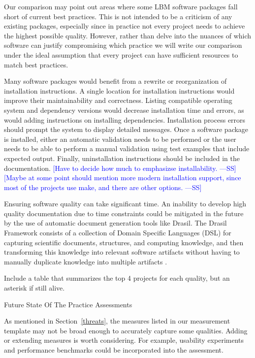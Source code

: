\documentclass[final, 3p, times, authoryear]{elsarticle}
\newcommand{\authornote}[3]{\textcolor{#1}{[#3 ---#2]}}
\newcommand{\authornote}[3]{}
\newcommand{\wss}[1]{\authornote{blue}{SS}{#1}} %
\begin{document}
Our comparison may point out areas where some LBM software packages fall short
of current best practices.  This is not intended to be a criticism of any
existing packages, especially since in practice not every project needs to
achieve the highest possible quality.  However, rather than delve into the
nuances of which software can justify compromising which practice we will write
our comparison under the ideal assumption that every project can have sufficient
resources to match best practices.

Many software packages would benefit from a rewrite or reorganization of
installation instructions. A single location for installation instructions would
improve their maintainability and correctness. Listing compatible operating
system and dependency versions would decrease installation time and errors, as
would adding instructions on installing dependencies. Installation process
errors should prompt the system to display detailed messages. Once a software
package is installed, either an automatic validation needs to be performed or
the user needs to be able to perform a manual validation using test examples
that include expected output. Finally, uninstallation instructions should be
included in the documentation. \wss{Have to decide how much to emphasizse
installability.}  \wss{Maybe at some point should mention more modern
installation support, since most of the projects use make, and there are other
options.}

Ensuring software quality can take significant time. An inability to develop
high quality documentation due to time constraints could be mitigated in the
future by the use of automatic document generation tools like Drasil. The Drasil
Framework consists of a collection of Domain Specific Languages (DSL) for
capturing scientific documents, structures, and computing knowledge, and then
transforming this knowledge into relevant software artifacts without having to
manually duplicate knowledge into multiple artifacts \citep{SzymczakEtAl2016}.

Include a table that summarizes the top 4 projects for each quality, but an
asterisk if still alive.

Future State Of The Practice Assessments

As mentioned in Section~\ref{threats}, the measures listed in our measurement
template may not be broad enough to accurately capture some qualities. Adding or
extending measures is worth considering. For example, usability experiments and
performance benchmarks could be incorporated into the assessment.
\end{document}
